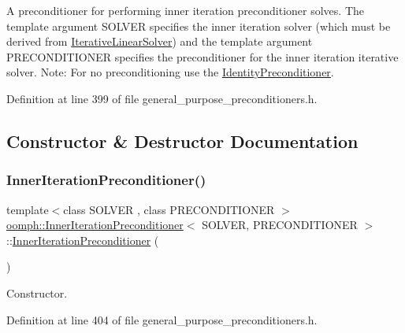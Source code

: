 A preconditioner for performing inner iteration preconditioner solves. The template argument S\+O\+L\+V\+ER specifies the inner iteration solver (which must be derived from \hyperlink{classoomph_1_1IterativeLinearSolver}{Iterative\+Linear\+Solver}) and the template argument P\+R\+E\+C\+O\+N\+D\+I\+T\+I\+O\+N\+ER specifies the preconditioner for the inner iteration iterative solver. Note\+: For no preconditioning use the \hyperlink{classoomph_1_1IdentityPreconditioner}{Identity\+Preconditioner}. 

Definition at line 399 of file general\+\_\+purpose\+\_\+preconditioners.\+h.



\subsection{Constructor \& Destructor Documentation}
\mbox{\label{classoomph_1_1InnerIterationPreconditioner_a467e8545ac2dd8650d22847c95122bee}} 
\subsubsection{\texorpdfstring{Inner\+Iteration\+Preconditioner()}{InnerIterationPreconditioner()}}
{\footnotesize\ttfamily template$<$class S\+O\+L\+V\+ER , class P\+R\+E\+C\+O\+N\+D\+I\+T\+I\+O\+N\+ER $>$ \\
\hyperlink{classoomph_1_1InnerIterationPreconditioner}{oomph\+::\+Inner\+Iteration\+Preconditioner}$<$ S\+O\+L\+V\+ER, P\+R\+E\+C\+O\+N\+D\+I\+T\+I\+O\+N\+ER $>$\+::\hyperlink{classoomph_1_1InnerIterationPreconditioner}{Inner\+Iteration\+Preconditioner} (\begin{DoxyParamCaption}{ }\end{DoxyParamCaption})\hspace{0.3cm}{\ttfamily [inline]}}



Constructor. 



Definition at line 404 of file general\+\_\+purpose\+\_\+preconditioners.\+h.

